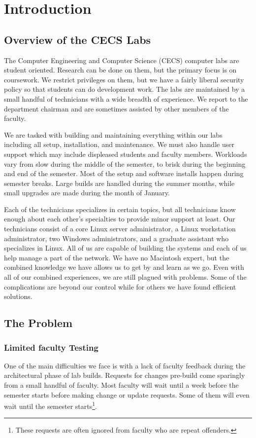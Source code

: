 \chapter{Introduction} \label{ch:introduction}
\section{Overview of the CECS Labs}

The Computer Engineering and Computer Science (CECS) computer labs are student oriented.  Research can be done on them, but the primary focus is on coursework.  We restrict privileges on them, but we have a fairly liberal security policy so that students can do development work.  The labs are maintained by a small handful of technicians with a wide breadth of experience.  We report to the department chairman and are sometimes assisted by other members of the faculty. 

We are tasked with building and maintaining everything within our labs including all setup, installation, and maintenance.  We must also handle user support which may include displeased students and faculty members.  Workloads vary from slow during the middle of the semester, to brisk during the beginning and end of the semester.  Most of the setup and software installs happen during semester breaks.  Large builds are handled during the summer months, while small upgrades are made during the month of January. 

Each of the technicians specializes in certain topics, but all technicians know enough about each other’s specialties to provide minor support at least.  Our technicians consist of a core Linux server administrator, a Linux workstation administrator, two Windows administrators, and a graduate assistant who specializes in Linux.  All of us are capable of building the systems and each of us help manage a part of the network.  We have no Macintosh expert, but the combined knowledge we have allows us to get by and learn as we go.  Even with all of our combined experiences, we are still plagued with problems.  Some of the complications are beyond our control while for others we have found efficient solutions.

\section{The Problem} \label{sec:the_problem}
\subsection{Limited faculty Testing}
One of the main difficulties we face is with a lack of faculty feedback during the architectural phase of lab builds.  Requests for changes pre-build come sparingly from a small handful of faculty.  Most faculty will wait until a week before the semester starts before making change or update requests.  Some of them will even wait until the semester starts\footnote{These requests are often ignored from faculty who are repeat offenders.}. 

